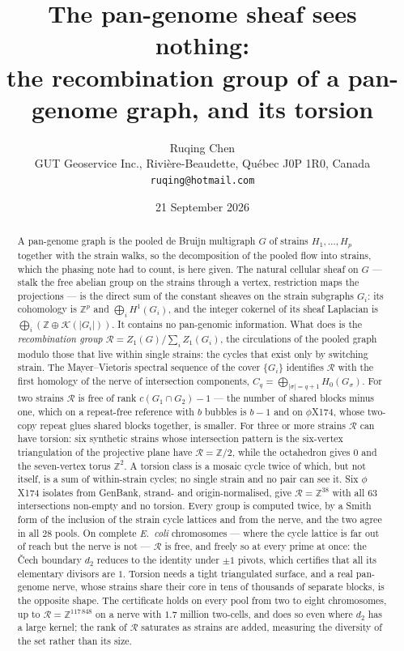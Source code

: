 \documentclass[11pt]{article}
\title{\bfseries The pan-genome sheaf sees nothing:\\
the recombination group of a pan-genome graph, and its torsion}
\author{Ruqing Chen\\[2pt]
\normalsize GUT Geoservice Inc., Rivi\`ere-Beaudette, Qu\'ebec J0P 1R0, Canada\\
\normalsize\texttt{ruqing@hotmail.com}}
\date{21 September 2026}
\theoremstyle{plain}
\theoremstyle{definition}
\theoremstyle{remark}
\newcommand{\Z}{\mathbb{Z}}
\newcommand{\K}{\mathcal{K}}
\newcommand{\Rec}{\mathcal{R}}
\begin{document}
\maketitle

\begin{abstract}
\noindent
A pan-genome graph is the pooled de Bruijn multigraph $G$ of strains $H_1,\dots,H_p$ together
with the strain walks, so the decomposition of the pooled flow into strains, which the
phasing note had to count, is here given. The natural cellular sheaf on $G$ --- stalk the
free abelian group on the strains through a vertex, restriction maps the projections --- is
the direct sum of the constant sheaves on the strain subgraphs $G_i$: its cohomology is
$\Z^p$ and $\bigoplus_i H^1(G_i)$, and the integer cokernel of its sheaf Laplacian is
$\bigoplus_i(\Z\oplus\K(|G_i|))$. It contains no pan-genomic information. What does is the
\emph{recombination group} $\Rec=Z_1(G)/\sum_iZ_1(G_i)$, the circulations of the pooled
graph modulo those that live within single strains: the cycles that exist only by switching
strain. The Mayer--Vietoris spectral sequence of the cover $\{G_i\}$ identifies $\Rec$ with the
first homology of the nerve of intersection components, $C_q=\bigoplus_{|\sigma|=q+1}
H_0(G_\sigma)$. For two strains $\Rec$ is free of rank $c(G_1\cap G_2)-1$ --- the number of
shared blocks minus one, which on a repeat-free reference with $b$ bubbles is $b-1$ and on
$\phi$X174, whose two-copy repeat glues shared blocks together, is smaller. For three or more
strains $\Rec$ can have torsion: six synthetic strains whose intersection pattern is the
six-vertex triangulation of the projective plane have $\Rec=\Z/2$, while the octahedron gives
$0$ and the seven-vertex torus $\Z^2$. A torsion class is a mosaic cycle twice of which, but
not itself, is a sum of within-strain cycles; no single strain and no pair can see it. Six
$\phi$X174 isolates from GenBank, strand- and origin-normalised, give $\Rec=\Z^{38}$ with all
$63$ intersections non-empty and no torsion. Every group is computed twice, by a Smith form of
the inclusion of the strain cycle lattices and from the nerve, and the two agree in all $28$
pools. On complete \emph{E.\ coli} chromosomes --- where the cycle lattice is far out of
reach but the nerve is not --- $\Rec$ is free, and freely so at every prime at once: the
\v Cech boundary $d_2$ reduces to the identity under $\pm1$ pivots, which certifies that all
its elementary divisors are $1$. Torsion needs a tight triangulated surface, and a real
pan-genome nerve, whose strains share their core in tens of thousands of separate blocks, is
the opposite shape. The certificate holds on every pool from two to eight chromosomes, up to
$\Rec=\Z^{117\,848}$ on a nerve with $1.7$ million two-cells, and does so even where $d_2$ has
a large kernel; the rank of $\Rec$ saturates as strains are added, measuring the diversity of
the set rather than its size.
\end{abstract}
\end{document}

